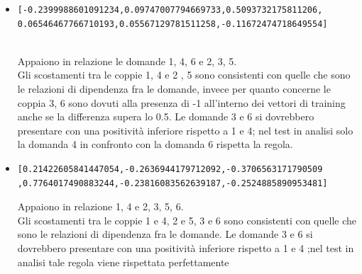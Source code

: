 \begin{itemize}
\item \begin{verbatim}[-0.2399988601091234,0.09747007794669733,0.5093732175811206,
0.06546467766710193,0.05567129781511258,-0.11672474718649554]\end{verbatim}\\
Appaiono in relazione le domande 1, 4, 6 e 2, 3, 5.\\
Gli scostamenti tra le  coppie 1, 4 e 2 , 5 sono consistenti con quelle che sono le relazioni di dipendenza fra le domande, invece per quanto concerne le coppia 3, 6 sono dovuti alla presenza di -1 all'interno dei vettori di training anche se la differenza supera lo 0.5.
Le domande 3 e 6 si dovrebbero presentare con una positivit\`a inferiore rispetto a 1 e 4; nel test in analisi solo la domanda 4 in confronto con la domanda 6 rispetta la regola.

\item \begin{verbatim}[0.21422605841447054,-0.2636944179712092,-0.3706563171790509
,0.7764017490883244,-0.23816083562639187,-0.2524885890953481]\end{verbatim}
Appaiono in relazione 1, 4 e 2, 3, 5, 6.\\
Gli scostamenti tra le coppie  1  e 4, 2 e 5, 3 e 6 sono consistenti con quelle che sono le relazioni di dipendenza fra le domande.
Le domande 3 e 6 si dovrebbero presentare con una positivit\`a inferiore rispetto a 1 e 4 ;nel test in analisi tale regola viene rispettata perfettamente
\end{itemize}


